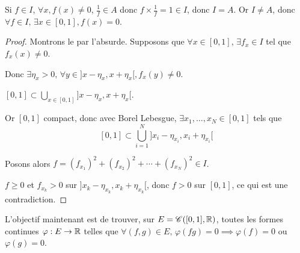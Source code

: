 \begin{remarque}
    Si $f \in I$, $\forall x, f(x) \neq 0$, $\frac 1 f \in A$ donc $f \times \frac 1 f = 1 \in I$, donc $I = A$.
    Or $I \neq A$, donc $\forall f \in I, \, \exists x \in [0, 1], f(x) = 0$.
\end{remarque}

\begin{proof}
    Montrons le par l'absurde. Supposons que $\forall x \in [0, 1], \, \exists f_x \in I$ tel que $f_x(x) \neq 0$.

    Donc $\exists \eta_x > 0, \, \forall y \in ]x - \eta_x, x + \eta_x[, f_x(y) \neq 0$.

    $[0, 1] \subset \bigcup_{x \in [0, 1]} ]x - \eta_x, x + \eta_x[$.

    Or $[0, 1]$ compact, donc avec Borel Lebesgue, $\exists x_1, \ldots, x_N \in [0, 1]$ tels que 
    \[
        [0, 1] \subset \bigcup_{i=1}^N ]x_i - \eta_{x_i}, x_i + \eta_{x_i}[
    \]

    Posons alors $f = (f_{x_1})^2 + (f_{x_2})^2 + \cdots + (f_{x_N})^2 \in I$.

    $f \geqslant 0$ et $f_{x_k} > 0$ sur $]x_k - \eta_{x_k}, x_k + \eta_{x_k}[$, donc $f > 0$ sur $[0, 1]$, ce qui est une contradiction.
\end{proof}

L'objectif maintenant est de trouver, sur $E = \mathscr C([0, 1], \mathbb{R})$, toutes les formes continues $\varphi : E \to \mathbb{R}$ 
telles que $\forall (f, g) \in E, \, \varphi(fg) = 0 \implies \varphi(f) = 0$ ou $\varphi(g) = 0$.

